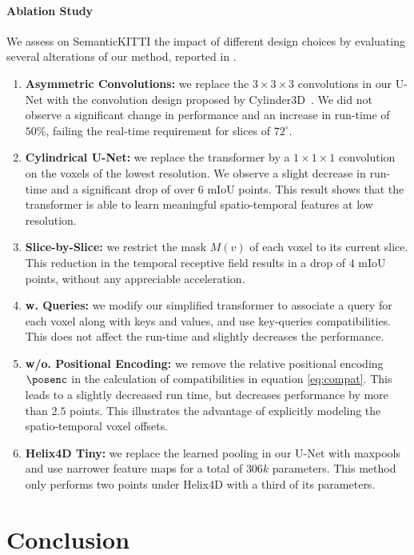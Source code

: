 \documentclass[runningheads]{tpls/llncs}
\begin{document}
\paragraph{Ablation Study}
We assess on SemanticKITTI the impact of different design choices by evaluating several alterations of our method, reported in .
\begin{enumerate}[label=\bf(\alph*), topsep=0cm, wide, labelwidth=!, labelindent=0pt]
    \item {\bf Asymmetric Convolutions:}\label{abla:asymconv} we replace the $3\times3\times3$ convolutions in our U-Net with the convolution design proposed by Cylinder3D~\cite{zhu2021cylindrical}. We did not observe a significant change in performance and an increase in run-time of $50\%$, failing the real-time requirement for slices of $72^\circ$.
\item {\bf Cylindrical U-Net:}\label{abla:cunet} we replace the transformer by a $1\times1\times1$ convolution on the voxels of the lowest resolution. We observe a slight decrease in run-time and a significant drop of over $6$ mIoU points. This result shows that the transformer is able to learn meaningful spatio-temporal features at low resolution.
    \item {\bf Slice-by-Slice:}\label{abla:sbs} we restrict the mask $M(v)$ of each voxel to its current slice. This reduction in the temporal receptive field results in a drop of $4$ mIoU points, without any appreciable acceleration.
    \item {\bf w. Queries:}\label{abla:wqueries} we modify our simplified transformer to associate a query for each voxel along with keys and values, and use key-queries compatibilities. This does not affect the run-time and slightly decreases the performance.
    \item {\bf w/o. Positional Encoding:}\label{abla:wope} {we remove the relative positional encoding $\posenc$ in the calculation of compatibilities in equation \eqref{eq:compat}.} This leads to a slightly decreased run time, but decreases performance by more than $2.5$ points. This illustrates the advantage of explicitly modeling the spatio-temporal voxel offsets.\item {\bf Helix4D Tiny:}\label{abla:tiny} we replace the learned pooling in our U-Net with maxpools and use narrower feature maps for a total of $306k$ parameters. This method only performs two points under Helix4D with a third of its parameters.
\end{enumerate} \section{Conclusion}\label{sec:conclusion}
\end{document}
